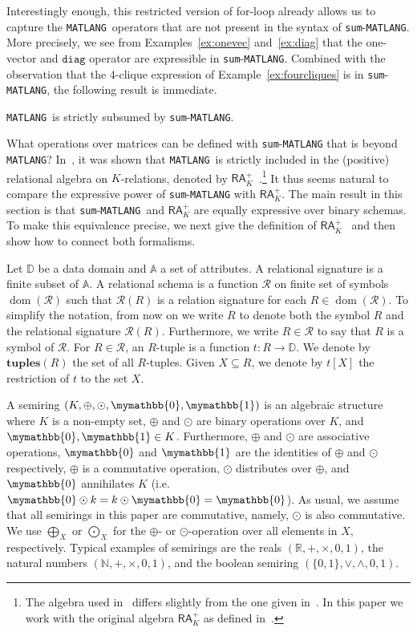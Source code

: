 \documentclass[sigconf]{acmart}
\newcommand{\NN}{\mathbb{N}}
\newcommand{\RR}{\mathbb{R}}
\newcommand{\diag}{\texttt{diag}}
\newcommand{\lang}{\texttt{MATLANG}\xspace}
\newcommand{\langsum}{\texttt{sum}-\texttt{MATLANG}\xspace}
\newcommand{\ddom}{\mathbb{D}}
\newcommand{\fdom}{\operatorname{dom}}
\newcommand{\att}{\mathbb{A}}
\newcommand{\tuples}{\mathbf{tuples}}
\newcommand{\cR}{\mathcal{R}}
\newcommand{\ksum}{\oplus}
\newcommand{\kprod}{\odot}
\newcommand{\bigksum}{\bigoplus}
\newcommand{\bigkprod}{\bigodot}
\newcommand{\kzero}{\mymathbb{0}}
\newcommand{\kone}{\mymathbb{1}}
\begin{document}
Interestingly enough, this restricted version of for-loop already allows us to capture the \lang\ operators that are not present in the syntax of \langsum. More precisely, we see from Examples~\ref{ex:onevec} and~\ref{ex:diag} that the one-vector and $\diag$ operator are expressible in \langsum. Combined with the observation that the $4$-clique
expression of Example~\ref{ex:fourcliques} is in \langsum, the following result is immediate.

\begin{corollary}
\lang\ is strictly subsumed by \langsum.
\end{corollary}

What operations over matrices can be defined with \langsum that is beyond \lang? In~\cite{brijder2019matrices}, it was shown that \lang\ is strictly included in the (positive) relational algebra on $K$-relations, denoted by $\mathsf{RA}_{K}^+$~\cite{GreenKT07}.\footnote{The algebra used in~\cite{brijder2019matrices} differs slightly from the one given in~\cite{GreenKT07}. In this paper we work with the original algebra $\mathsf{RA}_{K}^+$ as defined in~\cite{GreenKT07}.} 
It thus seems natural to compare the expressive power of \langsum with $\mathsf{RA}_{K}^+$. 
The main result in this section is that \langsum\ and $\mathsf{RA}_{K}^+$ 
are equally expressive over binary schemas. 
To make this equivalence precise, we next give the 
definition of $\mathsf{RA}_{K}^+$~\cite{GreenKT07} and then show how to connect both formalisms.

Let $\ddom$ be a data domain and $\att$ a set of attributes. A relational signature is a finite subset of $\att$. A relational schema is a function $\cR$ on finite set of symbols $\fdom(\cR)$ such that $\cR(R)$ is a relation signature for each $R \in \fdom(\cR)$. To simplify the notation, from now on we write $R$ to denote both the symbol $R$ and the relational signature $\cR(R)$.
Furthermore, we write $R \in \cR$ to say that $R$ is a symbol of $\cR$. 
For $R \in \cR$, an $R$-tuple is a function $t: R \rightarrow \ddom$. We denote by $\tuples(R)$ the set of all $R$-tuples. Given $X \subseteq R$, we denote by $t[X]$ the restriction of $t$ to the set $X$.

A semiring $(K, \ksum, \kprod, \kzero, \kone)$ is an algebraic structure where $K$ is a non-empty set, $\ksum$ and $\kprod$ are binary operations over $K$, and $\kzero, \kone \in K$. Furthermore,  $\ksum$ and $\kprod$ are associative operations, $\kzero$ and $\kone$ are the identities of $\ksum$ and $\kprod$ respectively, $\ksum$ is a commutative operation, $\kprod$ distributes over $\ksum$, and $\kzero$ annihilates $K$ (i.e. $\kzero \kprod k = k \kprod \kzero = \kzero$). As usual, we assume that all semirings in this paper are commutative, namely, $\kprod$ is also commutative. We use $\bigksum_X$ or $\bigkprod_X$ for the $\ksum$- or $\kprod$-operation over all elements in $X$, respectively. Typical examples of semirings are the reals $(\RR, +, \times, 0,1)$, the natural numbers $(\NN, +, \times, 0,1)$, and the boolean semiring $(\{0,1\}, \vee, \wedge, 0, 1)$. 
\end{document}
